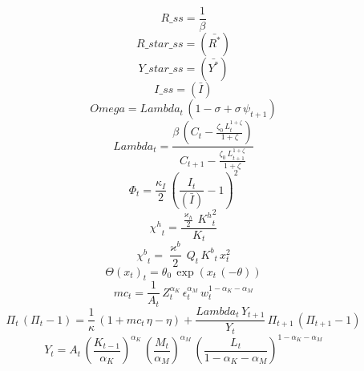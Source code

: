 \begin{dmath*}
R\_ss = \frac{1}{{\beta}}
\end{dmath*}
\begin{dmath*}
R\_star\_ss = (\bar{R^{*}})
\end{dmath*}
\begin{dmath*}
Y\_star\_ss = (\bar{Y^{*}})
\end{dmath*}
\begin{dmath*}
I\_ss = (\bar{I})
\end{dmath*}
\begin{dmath*}
Omega = {Lambda}_{t}\, \left(1-{\sigma}+{\sigma}\, {\psi}_{t+1}\right)
\end{dmath*}
\begin{dmath}
{Lambda}_{t}=\frac{{\beta}\, \left({C}_{t}-\frac{{\zeta_{0}}\, {L}_{t}^{1+{\zeta}}}{1+{\zeta}}\right)}{{C}_{t+1}-\frac{{\zeta_{0}}\, {L}_{t+1}^{1+{\zeta}}}{1+{\zeta}}}
\end{dmath}
\begin{dmath}
{\Phi}_{t}=\frac{{\kappa_{I}}}{2}\, \left(\frac{{I}_{t}}{(\bar{I})}-1\right)^{2}
\end{dmath}
\begin{dmath}
{\chi^{h}}_{t}=\frac{\frac{{\varkappa_{h}}}{2}\, {K^{h}}_{t}^{2}}{{K}_{t}}
\end{dmath}
\begin{dmath}
{\chi^{b}}_{t}=\frac{{\varkappa^{b}}}{2}\, {Q}_{t}\, {K^{b}}_{t}\, {x}_{t}^{2}
\end{dmath}
\begin{dmath}
{\Theta(x_{t})}_{t}={\theta_{0}}\, \exp\left({x}_{t}\, \left(-{\theta}\right)\right)
\end{dmath}
\begin{dmath}
{mc}_{t}=\frac{1}{{A}_{t}}\, {Z}_{t}^{{\alpha_{K}}}\, {\epsilon}_{t}^{{\alpha_{M}}}\, {w}_{t}^{1-{\alpha_{K}}-{\alpha_{M}}}
\end{dmath}
\begin{dmath}
{\Pi}_{t}\, \left({\Pi}_{t}-1\right)=\frac{1}{{\kappa}}\, \left(1+{mc}_{t}\, {\eta}-{\eta}\right)+\frac{{Lambda}_{t}\, {Y}_{t+1}}{{Y}_{t}}\, {\Pi}_{t+1}\, \left({\Pi}_{t+1}-1\right)
\end{dmath}
\begin{dmath}
{Y}_{t}={A}_{t}\, \left(\frac{{K}_{t-1}}{{\alpha_{K}}}\right)^{{\alpha_{K}}}\, \left(\frac{{M}_{t}}{{\alpha_{M}}}\right)^{{\alpha_{M}}}\, \left(\frac{{L}_{t}}{1-{\alpha_{K}}-{\alpha_{M}}}\right)^{1-{\alpha_{K}}-{\alpha_{M}}}
\end{dmath}
